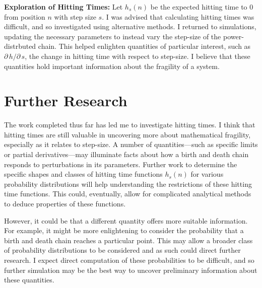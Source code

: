 \documentclass[12pt,letterpaper]{article}
\begin{document}
\noindent
\textbf{Exploration of Hitting Times:} Let $h_s(n)$ be the expected hitting time to $0$ from position
$n$ with step size $s$. I was advised that calculating hitting times was difficult, and so investigated
using alternative methods. I returned to simulations, updating the necessary parameters to instead vary
the step-size of the power-distrbuted chain. This helped enlighten quantities of particular interest,
such as $\partial\, h/ \partial\, s$, the change in hitting time with respect to step-size. I believe
that these quantities hold important information about the fragility of a system.


\section*{Further Research}
The work completed thus far has led me to investigate hitting times. I think that hitting times are
still valuable in uncovering more about mathematical fragility, especially as it relates to step-size.
A number of quantities---such as specific limits or partial derivatives---may illuminate facts about how
a birth and death chain responds to perturbations in its parameters. Further work to determine the
specific shapes and classes of hitting time functions $h_s(n)$ for various probability distributions
will help understanding the restrictions of these hitting time functions. This could, eventually, allow
for complicated analytical methods to deduce properties of these functions.

However, it could be that a different quantity offers more suitable information. For example, it might
be more enlightening to consider the probability that a birth and death chain reaches a particular
point. This may allow a broader class of probability distributions to be considered and as such could
direct further research. I expect direct computation of these probabilities to be difficult, and so
further simulation may be the best way to uncover preliminary information about these quantities.
\end{document}
